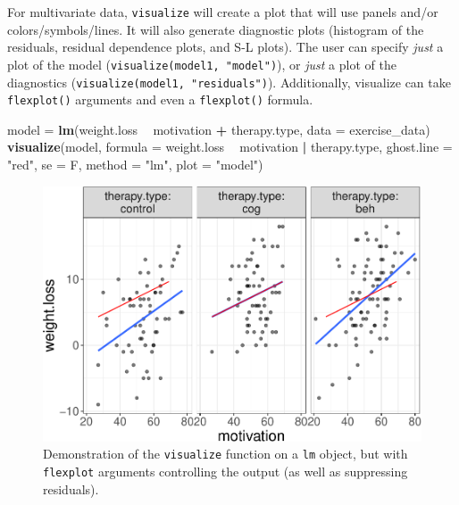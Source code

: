 \documentclass[
  man]{apa6}
\newenvironment{Shaded}{\begin{snugshade}}{\end{snugshade}}
\newcommand{\DataTypeTok}[1]{\textcolor[rgb]{0.13,0.29,0.53}{#1}}
\newcommand{\KeywordTok}[1]{\textcolor[rgb]{0.13,0.29,0.53}{\textbf{#1}}}
\newcommand{\NormalTok}[1]{#1}
\newcommand{\OperatorTok}[1]{\textcolor[rgb]{0.81,0.36,0.00}{\textbf{#1}}}
\newcommand{\StringTok}[1]{\textcolor[rgb]{0.31,0.60,0.02}{#1}}
\begin{document}
For multivariate data, \texttt{visualize} will create a plot that will use panels and/or colors/symbols/lines. It will also generate diagnostic plots (histogram of the residuals, residual dependence plots, and S-L plots). The user can specify \emph{just} a plot of the model (\texttt{visualize(model1,\ "model")}), or \emph{just} a plot of the diagnostics (\texttt{visualize(model1,\ "residuals")}). Additionally, visualize can take \texttt{flexplot()} arguments and even a \texttt{flexplot()} formula.

\begin{Shaded}
\begin{Highlighting}[]
\NormalTok{model =}\StringTok{ }\KeywordTok{lm}\NormalTok{(weight.loss }\OperatorTok{~}\StringTok{ }\NormalTok{motivation }\OperatorTok{+}\StringTok{ }\NormalTok{therapy.type, }\DataTypeTok{data =}\NormalTok{ exercise_data)}
\KeywordTok{visualize}\NormalTok{(model, }\DataTypeTok{formula =}\NormalTok{ weight.loss }\OperatorTok{~}\StringTok{ }\NormalTok{motivation }\OperatorTok{|}\StringTok{ }\NormalTok{therapy.type, }
          \DataTypeTok{ghost.line =} \StringTok{"red"}\NormalTok{, }\DataTypeTok{se =}\NormalTok{ F, }\DataTypeTok{method =} \StringTok{"lm"}\NormalTok{, }\DataTypeTok{plot =} \StringTok{"model"}\NormalTok{)}
\end{Highlighting}
\end{Shaded}

\begin{figure}
\centering
\includegraphics{flexplot_psychmeth_files/figure-latex/ancova2-1.pdf}
\caption{\label{fig:ancova2}Demonstration of the \texttt{visualize} function on a \texttt{lm} object, but with \texttt{flexplot} arguments controlling the output (as well as suppressing residuals). \label{fig:ancova2}}
\end{figure}
\end{document}
